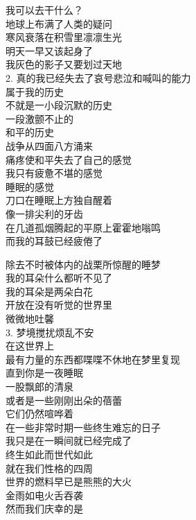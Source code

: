 \documentclass{article}
\begin{document}
我可以去干什么？\\
地球上布满了人类的疑问\\
寒风衰落在积雪里凛凛生光\\
明天一早又该起身了
\\
我灰色的影子又要划过天地 \\ 


2. 真的我已经失去了哀号悲泣和喊叫的能力\\
属于我的历史
\\
不就是一小段沉默的历史 \\ 


一段激颤不止的\\
和平的历史\\
战争从四面八方涌来\\
痛疼使和平失去了自己的感觉\\
我只有疲惫不堪的感觉\\
睡眠的感觉
\\
刀口在睡眠上方独自醒着 \\ 


像一排尖利的牙齿\\
在几道孤烟腾起的平原上霍霍地嗡鸣\\
而我的耳鼓已经疲倦了\\
\newpage

除去不时被体内的战栗所惊醒的睡梦\\
我的耳朵什么都听不见了\\
我的耳朵是两朵白花\\
开放在没有听觉的世界里
\\
微微地吐馨 \\ 


3. 梦境搅扰烦乱不安\\
在这世界上\\
最有力量的东西都喋喋不休地在梦里复现\\
直到你是一夜睡眠\\
一股飘郎的清泉\\
或者是一些刚刚出朵的蓓蕾
\\
它们仍然喧哗着 \\ 


在一些非常时期一些终生难忘的日子\\
我只是在一瞬间就已经完成了\\
终生如此而世代如此\\
就在我们性格的四周\\
世界的燃料早已是熊熊的大火\\
金雨如电火舌吞袭\\
然而我们庆幸的是\\
\newpage
\end{document}
